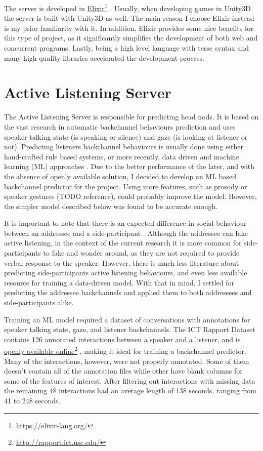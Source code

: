 \documentclass[]{simple-thesis}
\newcommand\fnurl[2]{%
  \href{#2}{#1}\footnote{\url{#2}}%
}
\begin{document}
The server is developed in \fnurl{Elixir}{https://elixir-lang.org/}.
Usually, when developing games in Unity3D the server is built with Unity3D as well.
The main reason I choose Elixir instead is my prior familiarity with it.
In addition, Elixir provides some nice benefits for this type of project, as it significantly simplifies the development of both web and concurrent programs.
Lastly, being a high level language with terse syntax and many high quality libraries accelerated the development process.

\section{Active Listening Server}\label{system:active_listening_server}

The Active Listening Server is responsible for predicting head nods.
It is based on the vast research in automatic backchannel behaviours prediction and uses speaker talking state (is speaking or silence) and gaze (is looking at listener or not).
Predicting listeners backchannel behaviours is usually done using either hand-crafted rule based systems, or more recently, data driven and machine learning (ML) approaches \citep{Morency2008}.
Due to the better performance of the later, and with the absence of openly available solution, I decided to develop an ML based backchannel predictor for the project.
Using more features, such as prosody \citep{Ward2000} or speaker gestures (TODO reference), could probably improve the model.
However, the simpler model described below was found to be accurate enough.

It is important to note that there is an expected difference in social behaviour between an addressee and a side-participant \citep{Clark1982}.
Although the addressee can fake active listening, in the context of the current research it is more common for side-participants to fake and wonder around, as they are not required to provide verbal response to the speaker.
However, there is much less literature about predicting side-participants active listening behaviours, and even less available resource for training a data-driven model.
With that in mind, I settled for predicting the addressee backchannels and applied them to both addressees and side-participants alike.

Training an ML model required a dataset of conversations with annotations for speaker talking state, gaze, and listener backchannels.
The ICT Rapport Dataset \citep{Gratch2007} contains 126 annotated interactions between a speaker and a listener, and is \fnurl{openly available online}{http://rapport.ict.usc.edu/}, making it ideal for training a backchannel predictor.
Many of the interactions, however, were not properly annotated.
Some of them doesn't contain all of the annotation files while other have blank columns for some of the features of interest.
After filtering out interactions with missing data the remaining 48 interactions had an average length of 138 seconds, ranging from 41 to 248 seconds.
\end{document}

